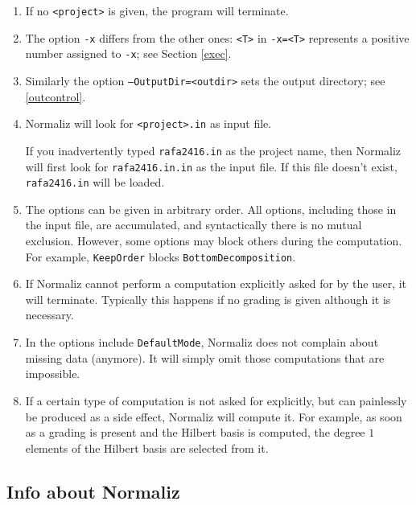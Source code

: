\documentclass[12pt,a4paper]{scrartcl}
\theoremstyle{definition}
\def\ttt{\texttt}
\begin{document}
\begin{enumerate}
	\item If no \ttt{<project>} is given, the
	program will terminate.
	
	\item The option \ttt{-x} differs from the other ones: \ttt{<T>} in \verb|-x=<T>|
	represents a positive number assigned to \ttt{-x}; see
	Section \ref{exec}.
	
	\item Similarly the option \ttt{---OutputDir=<outdir>} sets the output directory; see \ref{outcontrol}.
	
	\item Normaliz will look for \ttt{<project>.in} as input
	file.
	
	If you inadvertently typed \ttt{rafa2416.in} as the project
	name, then Normaliz will first look for \ttt{rafa2416.in.in}
	as the input file. If this file doesn't exist,
	\ttt{rafa2416.in} will be loaded.
	
	\item The options can be given in arbitrary order. All options, including those in the input file, are accumulated, and syntactically there is no mutual exclusion. However, some options may block others during the computation. For example, \verb|KeepOrder| blocks \verb|BottomDecomposition|.
	
	\item If Normaliz cannot perform a computation explicitly asked for by the
	user, it will terminate. Typically this happens if no grading is given although
	it is necessary.
	
	\item In the options include \verb|DefaultMode|, Normaliz does not complain about missing data
	(anymore). It will simply omit those computations that are impossible.
	
	\item If a certain type of computation is not asked for explicitly, but can
	painlessly be produced as a side effect, Normaliz will compute it. For
	example, as soon as a grading is present and the Hilbert basis is computed, the
	degree $1$ elements of the Hilbert basis are selected from it.
	
\end{enumerate}

\subsection{Info about Normaliz}
\end{document}
